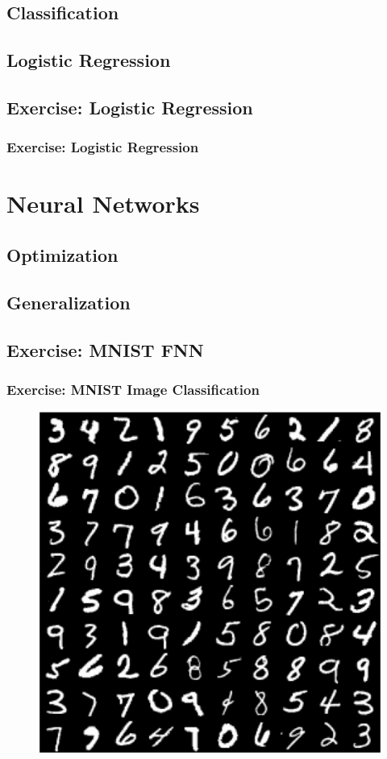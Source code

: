 \documentclass[aspectratio=169]{beamer}
\begin{document}
\subsection{Classification}
\subsection{Logistic Regression}

\subsection{Exercise: Logistic Regression}
\label{subsec:exercise-logistic-regression}

\begin{frame}
    \frametitle{Exercise: Logistic Regression}
    \begin{figure}
        \centering
    \end{figure}
\end{frame}

\section{Neural Networks}
\label{sec:neural-networks}

\subsection{Optimization}
\subsection{Generalization}

\subsection{Exercise: MNIST FNN}
\label{subsec:exercise-fnn}

\begin{frame}
    \frametitle{Exercise: MNIST Image Classification}
    
    \begin{figure}
        \centering
        \includegraphics[width=0.4\linewidth]{mnist.png}
    \end{figure}
\end{frame}
\end{document}
